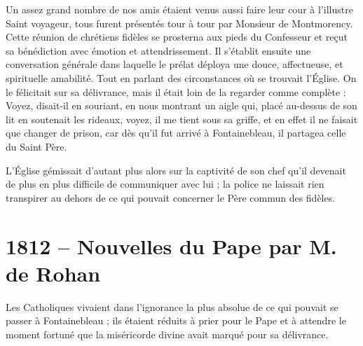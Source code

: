 \documentclass[11pt,a4paper]{report}
\begin{document}
Un assez grand nombre de nos amis étaient venus aussi faire leur cour à l'illustre Saint voyageur, tous furent présentés tour à tour par Monsieur de Montmorency. Cette réunion de chrétiens fidèles se prosterna aux pieds du Confesseur et reçut sa bénédiction avec émotion et attendrissement. Il s'établit ensuite une conversation générale dans laquelle le prélat déploya une douce, affectueuse, et spirituelle amabilité. Tout en parlant des circonstances où se trouvait l'Église. On le félicitait sur sa délivrance, mais il était loin de la regarder comme complète : Voyez, disait-il en souriant, en nous montrant un aigle qui, placé au-dessus de son lit en soutenait les rideaux, voyez, il me tient sous sa griffe, et en effet il ne faisait que changer de prison, car dès qu'il fut arrivé à Fontainebleau, il partagea celle du Saint Père.

L'Église gémissait d'autant plus alors sur la captivité de son chef qu'il devenait de plus en plus difficile de communiquer avec lui ; la police ne laissait rien transpirer au dehors de ce qui pouvait concerner le Père commun des fidèles.

\section*{1812 -- Nouvelles du Pape par M. de Rohan}

Les Catholiques vivaient dans l'ignorance la plus absolue de ce qui pouvait se passer à Fontainebleau ; ils étaient réduits à prier pour le Pape et à attendre le moment fortuné que la miséricorde divine avait marqué pour sa délivrance.
\end{document}
